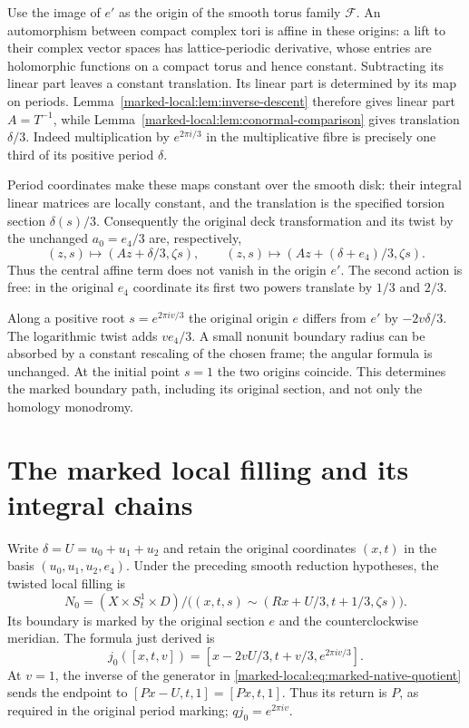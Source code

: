Use the image of $e'$ as the origin of the smooth torus family
$\mathcal F$. An automorphism between compact complex tori is
affine in these origins: a lift to their complex vector spaces
has lattice-periodic derivative, whose entries are holomorphic
functions on a compact torus and hence constant. Subtracting its
linear part leaves a constant translation. Its linear part is
determined by its map on periods. Lemma~\ref{marked-local:lem:inverse-descent}
therefore gives linear part $A=T^{-1}$, while
Lemma~\ref{marked-local:lem:conormal-comparison} gives translation $\delta/3$.
Indeed multiplication by $e^{2\pi i/3}$ in the multiplicative
fibre is precisely one third of its positive period $\delta$.

Period coordinates make these maps constant over the smooth disk:
their integral linear matrices are locally constant, and the
translation is the specified torsion section $\delta(s)/3$.
Consequently the original deck transformation and its twist by
the unchanged $a_0=e_4/3$ are, respectively,
\begin{equation}\label{marked-local:eq:actual-affine-actions}
 (z,s)\longmapsto(Az+\delta/3,\zeta s),\qquad
 (z,s)\longmapsto(Az+(\delta+e_4)/3,\zeta s).
\end{equation}
Thus the central affine term does not vanish in the origin $e'$.
The second action is free: in the original $e_4$ coordinate its
first two powers translate by $1/3$ and $2/3$.

Along a positive root $s=e^{2\pi iv/3}$ the original origin $e$
differs from $e'$ by $-2v\delta/3$. The logarithmic twist adds
$ve_4/3$. A small nonunit boundary radius can be absorbed by a
constant rescaling of the chosen frame; the angular formula is
unchanged. At the initial point $s=1$ the two origins coincide.
This determines the marked boundary path, including its original
section, and not only the homology monodromy.

\section{The marked local filling and its integral chains}

Write $\delta=U=u_0+u_1+u_2$ and retain the original coordinates
$(x,t)$ in the basis $(u_0,u_1,u_2,e_4)$. Under the preceding
smooth reduction hypotheses, the twisted local filling is
\begin{equation}\label{marked-local:eq:marked-native-quotient}
 N_0=(X\times S^1_t\times D)/
 \bigl((x,t,s)\sim(Rx+U/3,t+1/3,\zeta s)\bigr).
\end{equation}
Its boundary is marked by the original section $e$ and the
counterclockwise meridian. The formula just derived is
\begin{equation}\label{marked-local:eq:marked-native-j}
 j_0([x,t,v])=[x-2vU/3,t+v/3,e^{2\pi iv/3}].
\end{equation}
At $v=1$, the inverse of the generator in
\eqref{marked-local:eq:marked-native-quotient} sends the endpoint to
$[Px-U,t,1]=[Px,t,1]$. Thus its return is $P$, as required in
the original period marking; $qj_0=e^{2\pi iv}$.


